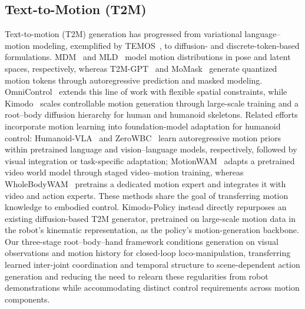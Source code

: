 \subsection{Text-to-Motion (T2M)}
Text-to-motion (T2M) generation has progressed from variational language--motion modeling, exemplified by TEMOS~\cite{temos}, to diffusion- and discrete-token-based formulations. MDM~\cite{mdm} and MLD~\cite{mld} model motion distributions in pose and latent spaces, respectively, whereas T2M-GPT~\cite{t2mgpt} and MoMask~\cite{momask} generate quantized motion tokens through autoregressive prediction and masked modeling. OmniControl~\cite{omnicontrol} extends this line of work with flexible spatial constraints, while Kimodo~\cite{kimodo} scales controllable motion generation through large-scale training and a root--body diffusion hierarchy for human and humanoid skeletons. Related efforts incorporate motion learning into foundation-model adaptation for humanoid control: Humanoid-VLA~\cite{humanoidvla} and ZeroWBC~\cite{zerowbc} learn autoregressive motion priors within pretrained language and vision--language models, respectively, followed by visual integration or task-specific adaptation; MotionWAM~\cite{motionwam} adapts a pretrained video world model through staged video--motion training, whereas WholeBodyWAM~\cite{wholebodywam_motionpriors} pretrains a dedicated motion expert and integrates it with video and action experts. These methods share the goal of transferring motion knowledge to embodied control. Kimodo-Policy instead directly repurposes an existing diffusion-based T2M generator, pretrained on large-scale motion data in the robot's kinematic representation, as the policy's motion-generation backbone.
Our three-stage root--body--hand framework conditions generation on visual observations and motion history for closed-loop loco-manipulation, transferring learned inter-joint coordination and temporal structure to scene-dependent action generation and reducing the need to relearn these regularities from robot demonstrations while accommodating distinct control requirements across motion components.